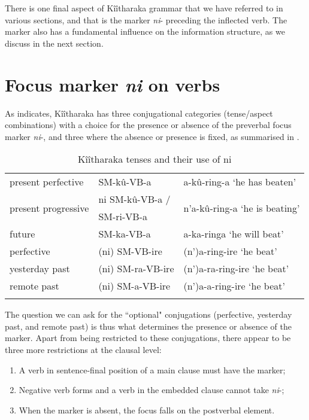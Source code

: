 \documentclass[output=paper]{langscibook}
\begin{document}
 There is one final aspect of Kîîtharaka grammar that we have referred to in various sections, and that is the marker \textit{ni}- preceding the inflected verb. The marker also has a fundamental influence on the information structure, as we discuss in the next section.

\section{Focus marker \textit{ni} on verbs}
\label{bkm:Ref111628808}\label{bkm:Ref119919394}\label{bkm:Ref119919238}
As \citet{Muriungi2005} indicates, Kîîtharaka has three conjugational categories (tense\slash aspect combinations) with a choice for the presence or absence of the preverbal focus marker \textit{ni}-, and three where the absence or presence is fixed, as summarised in .


\begin{table}[ht]
\begin{tabularx}{\textwidth}{lXl}
\lsptoprule
present perfective & SM-kû-VB-a & a-kû-ring-a ‘he has beaten’\\
\multirow{2}{*}{present progressive} & ni SM-kû-VB-a / & \multirow{2}{*}{n’a-kû-ring-a ‘he is beating’}\\
& SM-ri-VB-a & \\
future & SM-ka-VB-a & a-ka-ringa ‘he will beat’\\
perfective & (ni) SM-VB-ire & (n’)a-ring-ire ‘he beat’\\
yesterday past & (ni) SM-ra-VB-ire & (n’)a-ra-ring-ire ‘he beat’\\
remote past & (ni) SM-a-VB-ire & (n’)a-a-ring-ire ‘he beat’\\
\lspbottomrule
\end{tabularx}
\caption{Kîîtharaka tenses and their use of ni}
\label{tab:thk-ni-tenses}
\end{table}

The question we can ask for the ``optional" conjugations (perfective, yesterday past, and remote past) is thus what determines the presence or absence of the marker. Apart from being restricted to these conjugations, there appear to be three more restrictions at the clausal level:\largerpage

\begin{enumerate}\itemsep=.66\itemsep
\item A verb in sentence-final position of a main clause must have the marker;
\item  Negative verb forms and a verb in the embedded clause cannot take \textit{ni}-;
\item When the marker is absent, the focus falls on the postverbal element.
\end{enumerate}
\end{document}
